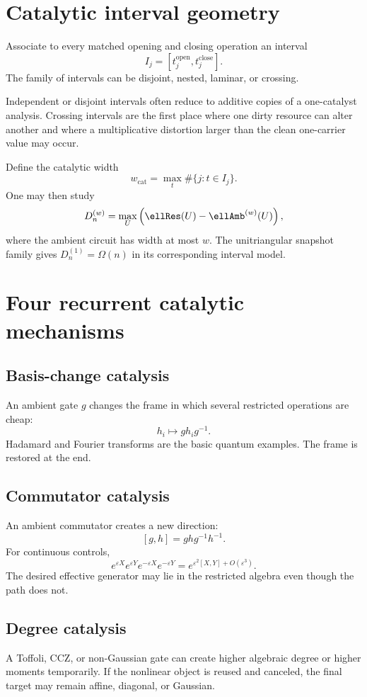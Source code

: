 \section{Catalytic interval geometry}
Associate to every matched opening and closing operation an interval
\[
I_j=[t_j^{\mathrm{open}},t_j^{\mathrm{close}}].
\]
The family of intervals can be disjoint, nested, laminar, or crossing.

\begin{principle}
Independent or disjoint intervals often reduce to additive copies of a one-catalyst analysis.  Crossing intervals are the first place where one dirty resource can alter another and where a multiplicative distortion larger than the clean one-carrier value may occur.
\end{principle}

Define the catalytic width
\[
w_{\mathrm{cat}}=
\max_t
\#\{j:t\in I_j\}.
\]
One may then study
\[
D_n^{(w)}
=
\max_{U}
\left(
\ellRes(U)-\ellAmb^{(w)}(U)
\right),
\]
where the ambient circuit has width at most $w$.  The unitriangular snapshot family gives $D_n^{(1)}=\Omega(n)$ in its corresponding interval model.

\section{Four recurrent catalytic mechanisms}
\subsection{Basis-change catalysis}
An ambient gate $g$ changes the frame in which several restricted operations are cheap:
\[
h_i\mapsto gh_ig^{-1}.
\]
Hadamard and Fourier transforms are the basic quantum examples.  The frame is restored at the end.

\subsection{Commutator catalysis}
An ambient commutator creates a new direction:
\[
[g,h]=ghg^{-1}h^{-1}.
\]
For continuous controls,
\[
e^{\varepsilon X}e^{\varepsilon Y}e^{-\varepsilon X}e^{-\varepsilon Y}
=
e^{\varepsilon^2[X,Y]+O(\varepsilon^3)}.
\]
The desired effective generator may lie in the restricted algebra even though the path does not.

\subsection{Degree catalysis}
A Toffoli, CCZ, or non-Gaussian gate can create higher algebraic degree or higher moments temporarily.  If the nonlinear object is reused and canceled, the final target may remain affine, diagonal, or Gaussian.


